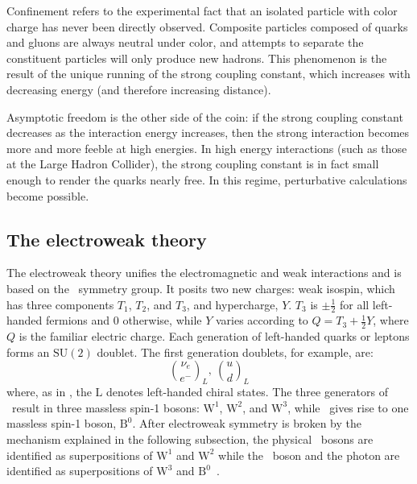 Confinement refers to the experimental fact that an isolated particle with color charge has never been directly observed. Composite particles composed of quarks and gluons are always neutral under color, and attempts to separate the constituent particles will only produce new hadrons. This phenomenon is the result of the unique running of the strong coupling constant, which increases with decreasing energy (and therefore increasing distance).    

Asymptotic freedom is the other side of the coin: if the strong coupling constant decreases as the interaction energy increases, then the strong interaction becomes more and more feeble at high energies. In high energy interactions (such as those at the Large Hadron Collider), the strong coupling constant is in fact small enough to render the quarks nearly free. In this regime, perturbative calculations become possible.

\subsection{The electroweak theory}
The electroweak theory unifies the electromagnetic and weak interactions and is based on the \ewsymm\ symmetry group. It posits two new charges: weak isospin, which has three components $T_{1}$, $T_{2}$, and $T_{3}$, and hypercharge, $Y$. $T_{3}$ is $\pm\frac{1}{2}$ for all left-handed fermions and 0 otherwise, while $Y$ varies according to $Q=T_{3}+\frac{1}{2}Y$, where $Q$ is the familiar electric charge. Each generation of left-handed quarks or leptons forms an $\mathrm{SU}(2)$ doublet. The first generation doublets, for example, are:
\begin{equation}
    \binom{\nu_{e}}{e^{-}}_{L},\ \binom{u}{d}_{L}
\end{equation}
where, as in \sutwol, the $\mathrm{L}$ denotes left-handed chiral states. The three generators of \sutwol\ result in three massless spin-1 bosons: $\mathrm{W}^{1}$, $\mathrm{W}^{2}$, and $\mathrm{W}^{3}$, while \uoney\ gives rise to one massless spin-1 boson, $\mathrm{B}^{0}$. After electroweak symmetry is broken by the mechanism explained in the following subsection, the physical \PWpm\ bosons are identified as superpositions of $\mathrm{W}^{1}$ and $\mathrm{W}^{2}$ while the \cPZ\ boson and the photon are identified as superpositions of $\mathrm{W}^{3}$ and $\mathrm{B}^{0}$~\cite{weinberg_leptons}.

